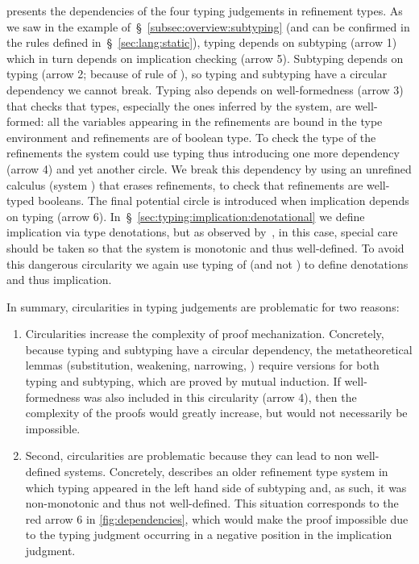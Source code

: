 %
 presents the dependencies of the four typing judgements in refinement types.
As we saw in the example of~\S~\ref{subsec:overview:subtyping} 
(and can be confirmed in the rules defined in~\S~\ref{sec:lang:static}),
typing depends on subtyping (arrow 1) which in turn depends on implication checking (arrow 5).
Subtyping depends on typing (arrow 2; because of rule \sWitn of ),
so typing and subtyping have a circular dependency we cannot break.
%
Typing also depends on well-formedness (arrow 3) that checks that
types, especially the ones inferred by the system, are well-formed:
all the variables appearing in the refinements are bound in the type environment
and refinements are of boolean type.
To check the type of the refinements the system could use typing
thus introducing one more dependency (arrow 4) and yet another circle.
We break this dependency by using an unrefined calculus (system \sysf)
that erases refinements, to check that refinements are well-typed booleans.
%
The final potential circle is introduced when implication depends on typing (arrow 6).
In~\S~\ref{sec:typing:implication:denotational} we define implication via type denotations,
but as observed by~\citet{Greenberg13}, in this case, special care should be taken
so that the system is monotonic and thus well-defined.
To avoid this dangerous circularity we again use typing of \sysf (and not \sysrf) to define
denotations and thus implication.

In summary, circularities in typing judgements are problematic for two reasons:
\begin{enumerate}[leftmargin=*]
\item Circularities increase the complexity of proof mechanization. 
Concretely, because typing and subtyping have a circular dependency, 
the metatheoretical lemmas (substitution, weakening, narrowing, \etc) 
require versions for both typing and subtyping, which are proved by mutual induction. 
If well-formedness was also included in this circularity (arrow 4),
 then the complexity of the proofs would greatly increase, 
 but would not necessarily be impossible.
\item Second, circularities are problematic because they can lead to non well-defined systems. 
Concretely, \citet{Greenberg13} describes an older refinement type system 
in which typing appeared in the left hand side of subtyping and, as such, 
it was non-monotonic and thus not well-defined. 
This situation corresponds to the red arrow 6 in \cref{fig:dependencies}, 
which would make the proof impossible due to the typing judgment occurring in 
a negative position in the implication judgment.  
\end{enumerate}


